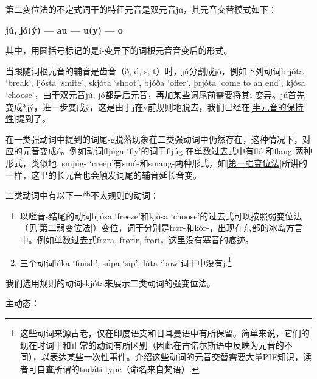 第二变位法的不定式词干的特征元音是双元音jú，其元音交替模式如下：
\begin{center}
    \textbf{jú, jó(ý) --- au --- u(y) --- o}
\end{center}


其中，用圆括号标记的是i-变异下的词根元音音变后的形式。

当跟随词根元音的辅音是齿音（ð, d, s, t）时，jú分割成jó，例如下列动词brjóta `break‌', ljósta `smite‌', skjóta `shoot‌', bjóða `offer‌', þrjóta `come to an end‌', kjósa `choose‌'，由于双元音jú, jó都是后元音，再加某些词尾前需要将其i-变异。jú首先变成*jý，进一步变成ý，这是由于j在y前规则地脱去，我们已经在\ref{半元音的保持性}提到了。

在一类强动词中提到的词尾-g脱落现象在二类强动词中仍然存在，这种情况下，对应的元音变成ó。例如动词fljúga
`fly‌'的词干fljúg-在单数过去式中有fló-和flaug-两种形式，类似地, smjúg- `creep‌'有smó-和smaug-两种形式，如\ref{第一强变位法}所讲的一样，这里的长元音也会触发词尾的辅音延长音变。

二类动词中有以下一些不太规则的动词：

\begin{enumerate}
    \item
          以咝音s结尾的动词frjósa `freeze‌'和kjósa `choose‌'的过去式可以按照弱变位法（见\ref{第二弱变位法}）变位，词干分别是frør-和kór-，出现在东部的冰岛方言中。例如单数过去式frøra, frørir, frøri，这里没有塞音的痕迹。
    \item
          三个动词lúka `finish‌', súpa `sip‌', lúta `bow‌'词干中没有j.\footnote{这些动词来源古老，仅在印度语支和日耳曼语中有所保留。简单来说，它们的现在时词干和正常的动词有所区别（因此在古诺尔斯语中反映为元音的不同），以表达某些一次性事件。介绍这些动词的元音交替需要大量PIE知识，读者可自查所谓的tudáti-type（命名来自梵语）.}
\end{enumerate}

我们选用规则的动词skjóta来展示二类动词的强变位法。

主动态：

